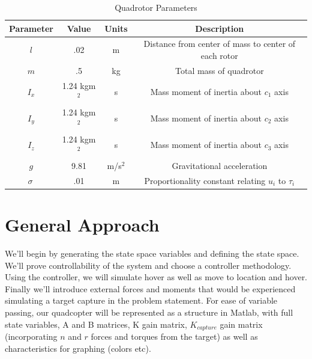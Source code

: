 \documentclass{article}
\begin{document}
\begin{multicols}{2}
\begin{table}[t] %
\begin{centering}
\begin{tabular}{|cccc|}
\hline
Parameter & Value & Units  & Description  \\
\hline
 $l$  &  .02& m & Distance from center of mass to center of each rotor  \\
 $m$& .5 & kg &Total mass of quadrotor   \\
 $I_{x}$ & 1.24 kgm$^2 $ & s  & Mass moment of inertia about $c_1$ axis \\
 $I_{y}$ & 1.24 kgm$^2 $ & s  & Mass moment of inertia about $c_2$ axis \\
 $I_{z}$ & 1.24 kgm$^2 $ & s  & Mass moment of inertia about $c_3$ axis \\
$ g$ &9.81 & m/s$^2$ & Gravitational acceleration\\
$\sigma\ $& .01 & m & Proportionality constant relating $u_i $ to $\tau_i$\\
\hline
\end{tabular}
\caption{Quadrotor Parameters}
\label{table:Qparams}
\end{centering}
\end{table}


\section*{General Approach}
We'll begin by generating the state space variables and defining the state space.  We'll prove controllability of the system and choose a controller methodology.  Using the controller, we will simulate hover as well as move to location and hover.  Finally we'll introduce external forces and moments that would be experienced simulating a target capture in the problem statement.  For ease of variable passing, our quadcopter will be represented as a structure in Matlab, with full state variables, A and B matrices, K gain matrix, $K_{capture}$ gain matrix (incorporating $n$ and $r$ forces and torques from the target) as well as characteristics for graphing (colors etc).


\end{multicols}
\end{document}
